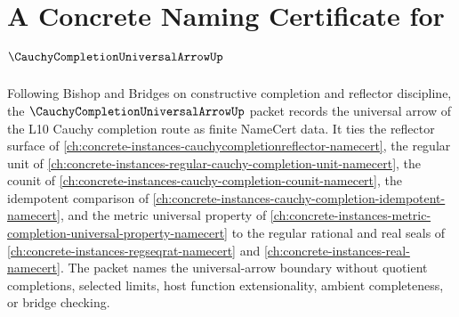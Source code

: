 \chapter{A Concrete Naming Certificate for $\CauchyCompletionUniversalArrowUp$}
\label{ch:concrete-instances-cauchy-completion-universal-arrow-namecert}

Following Bishop and Bridges on constructive completion and reflector discipline, the $\CauchyCompletionUniversalArrowUp$ packet records the universal arrow of the L10 Cauchy completion route as finite NameCert data. It ties the reflector surface of \autoref{ch:concrete-instances-cauchycompletionreflector-namecert}, the regular unit of \autoref{ch:concrete-instances-regular-cauchy-completion-unit-namecert}, the counit of \autoref{ch:concrete-instances-cauchy-completion-counit-namecert}, the idempotent comparison of \autoref{ch:concrete-instances-cauchy-completion-idempotent-namecert}, and the metric universal property of \autoref{ch:concrete-instances-metric-completion-universal-property-namecert} to the regular rational and real seals of \autoref{ch:concrete-instances-regseqrat-namecert} and \autoref{ch:concrete-instances-real-namecert}. The packet names the universal-arrow boundary without quotient completions, selected limits, host function extensionality, ambient completeness, or bridge checking.

